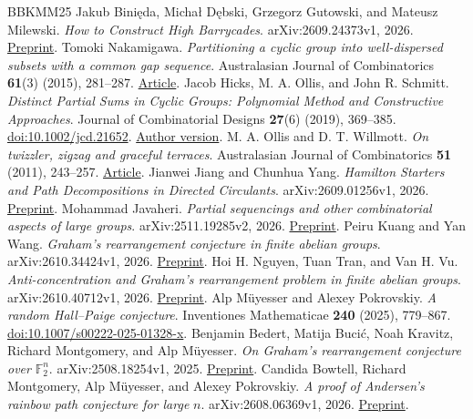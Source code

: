 \documentclass[11pt,a4paper]{article}
\begin{document}
\begin{thebibliography}{BBKMM25}
\small
\setlength{\itemsep}{0pt plus 1pt}
Jakub Binięda, Michał Dębski, Grzegorz Gutowski, and Mateusz Milewski. \emph{How to Construct High Barrycades}. arXiv:2609.24373v1, 2026. \href{https://arxiv.org/html/2609.24373v1}{Preprint}.
Tomoki Nakamigawa. \emph{Partitioning a cyclic group into well-dispersed subsets with a common gap sequence}. Australasian Journal of Combinatorics \textbf{61}(3) (2015), 281--287. \href{https://ajc.maths.uq.edu.au/pdf/61/ajc_v61_p281.pdf}{Article}.
Jacob Hicks, M. A. Ollis, and John R. Schmitt. \emph{Distinct Partial Sums in Cyclic Groups: Polynomial Method and Constructive Approaches}. Journal of Combinatorial Designs \textbf{27}(6) (2019), 369--385. \href{https://doi.org/10.1002/jcd.21652}{doi:10.1002/jcd.21652}. \href{https://arxiv.org/abs/1809.02684}{Author version}.
M. A. Ollis and D. T. Willmott. \emph{On twizzler, zigzag and graceful terraces}. Australasian Journal of Combinatorics \textbf{51} (2011), 243--257. \href{https://ajc.maths.uq.edu.au/pdf/51/ajc_v51_p243.pdf}{Article}.
Jianwei Jiang and Chunhua Yang. \emph{Hamilton Starters and Path Decompositions in Directed Circulants}. arXiv:2609.01256v1, 2026. \href{https://arxiv.org/html/2609.01256v1}{Preprint}.
Mohammad Javaheri. \emph{Partial sequencings and other combinatorial aspects of large groups}. arXiv:2511.19285v2, 2026. \href{https://arxiv.org/abs/2511.19285v2}{Preprint}.
Peiru Kuang and Yan Wang. \emph{Graham's rearrangement conjecture in finite abelian groups}. arXiv:2610.34424v1, 2026. \href{https://arxiv.org/abs/2610.34424v1}{Preprint}.
Hoi H. Nguyen, Tuan Tran, and Van H. Vu. \emph{Anti-concentration and Graham's rearrangement problem in finite abelian groups}. arXiv:2610.40712v1, 2026. \href{https://arxiv.org/abs/2610.40712v1}{Preprint}.
Alp Müyesser and Alexey Pokrovskiy. \emph{A random Hall--Paige conjecture}. Inventiones Mathematicae \textbf{240} (2025), 779--867. \href{https://doi.org/10.1007/s00222-025-01328-x}{doi:10.1007/s00222-025-01328-x}.
Benjamin Bedert, Matija Bucić, Noah Kravitz, Richard Montgomery, and Alp Müyesser. \emph{On Graham's rearrangement conjecture over} \(\mathbb F_2^n\). arXiv:2508.18254v1, 2025. \href{https://arxiv.org/abs/2508.18254v1}{Preprint}.
Candida Bowtell, Richard Montgomery, Alp Müyesser, and Alexey Pokrovskiy. \emph{A proof of Andersen's rainbow path conjecture for large} \(n\). arXiv:2608.06369v1, 2026. \href{https://arxiv.org/abs/2608.06369v1}{Preprint}.

\end{thebibliography}
\end{document}
